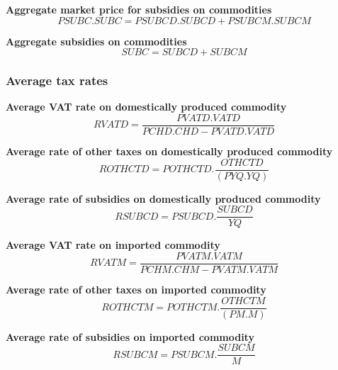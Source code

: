 \documentclass[12pt]{article}
\numberwithin{equation}{section}
\begin{document}
\noindent \textbf{Aggregate market price for subsidies on commodities} 
\begin{dmath}
PSUBC . SUBC = PSUBCD . SUBCD + PSUBCM . SUBCM
\label{Exception_taxes_prices.mdlPSUBC}
\end{dmath}

\noindent \textbf{Aggregate subsidies on commodities} 
\begin{dmath}
SUBC = SUBCD + SUBCM
\label{Exception_taxes_prices.mdlSUBC}
\end{dmath}



\subsubsection{Average tax rates}



\noindent \textbf{Average VAT rate on domestically produced commodity} 
\begin{dmath}
RVATD = \frac{PVATD . VATD}{PCHD . CHD - PVATD . VATD}
\label{Exception_taxes_prices.mdlRVATD}
\end{dmath}

\noindent \textbf{Average rate of other taxes on domestically produced commodity} 
\begin{dmath}
ROTHCTD = POTHCTD . \frac{OTHCTD}{\left( PYQ . YQ \right)}
\label{Exception_taxes_prices.mdlROTHCTD}
\end{dmath}

\noindent \textbf{Average rate of subsidies on domestically produced commodity} 
\begin{dmath}
RSUBCD = PSUBCD . \frac{SUBCD}{YQ}
\label{Exception_taxes_prices.mdlRSUBCD}
\end{dmath}

\noindent \textbf{Average VAT rate on imported commodity} 
\begin{dmath}
RVATM = \frac{PVATM . VATM}{PCHM . CHM - PVATM . VATM}
\label{Exception_taxes_prices.mdlRVATM}
\end{dmath}

\noindent \textbf{Average rate of other taxes on imported commodity} 
\begin{dmath}
ROTHCTM = POTHCTM . \frac{OTHCTM}{\left( PM . M \right)}
\label{Exception_taxes_prices.mdlROTHCTM}
\end{dmath}

\noindent \textbf{Average rate of subsidies on imported commodity} 
\begin{dmath}
RSUBCM = PSUBCM . \frac{SUBCM}{M}
\label{Exception_taxes_prices.mdlRSUBCM}
\end{dmath}
\end{document}
